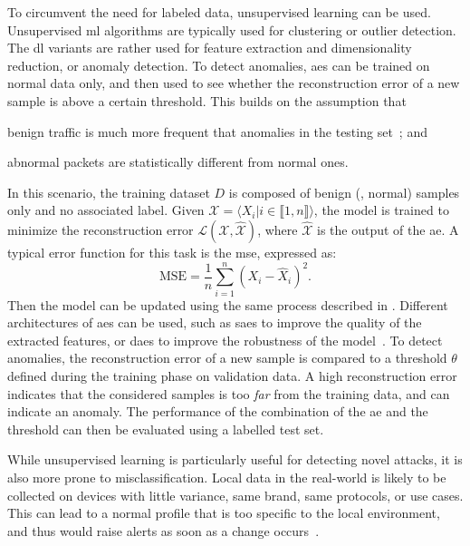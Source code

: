 To circumvent the need for labeled data, unsupervised learning can be used.
Unsupervised \gls{ml} algorithms are typically used for clustering or outlier detection.
The \gls{dl} variants are rather used for feature extraction and dimensionality reduction, or anomaly detection.
To detect anomalies, \glspl{ae} can be trained on normal data only, and then used to see whether the reconstruction error of a new sample is above a certain threshold.
This builds on the assumption that
\begin{enumerate*}[(i)]
  \item benign traffic is much more frequent that anomalies in the testing set~\cite{chandola_Anomalydetectionsurvey_2009}; and
  \item abnormal packets are statistically different from normal ones.
\end{enumerate*}
In this scenario, the training dataset $D$ is composed of benign (\ie, normal) samples only and no associated label.
Given $\mathcal{X} = \langle X_i | i \in \llbracket 1, n \rrbracket \rangle $, the model is trained to minimize the reconstruction error $\mathcal{L}(\mathcal{X}, \hat{\mathcal{X}})$, where $\hat{\mathcal{X}}$ is the output of the \gls{ae}.
A typical error function for this task is the \gls{mse}, expressed as:
\begin{equation}
  \text{MSE} = \frac{1}{n} \sum_{i=1}^{n} \left( X_i - \hat{X}_i \right)^2.
\end{equation}
Then the model can be updated using the same process described in .
Different architectures of \glspl{ae} can be used, such as \glspl{sae} to improve the quality of the extracted features, or \glspl{dae} to improve the robustness of the model~\cite{gjorgiev_TimeSeriesAnomaly_2020}. 
To detect anomalies, the reconstruction error of a new sample is compared to a threshold $\theta$ defined during the training phase on validation data.
A high reconstruction error indicates that the considered samples is too \emph{far} from the training data, and can indicate an anomaly.
The performance of the combination of the \gls{ae} and the threshold can then be evaluated using a labelled test set.

While unsupervised learning is particularly useful for detecting novel attacks, it is also more prone to misclassification.
Local data in the real-world is likely to be collected on devices with little variance, \eg same brand, same protocols, or use cases.
This can lead to a normal profile that is too specific to the local environment, and thus would raise alerts as soon as a change occurs~\cite{liu_MachineLearningDeep_2019}.

